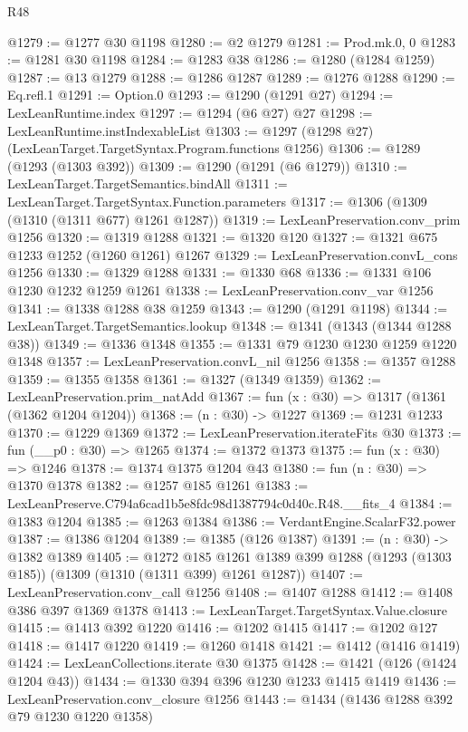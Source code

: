 \begin{lexlean}{R48}
\begin{coremodule}
@1279 := @1277 @30 @1198
@1280 := @2 @1279
@1281 := Prod.mk.{0, 0}
@1283 := @1281 @30 @1198
@1284 := @1283 @38
@1286 := @1280 (@1284 @1259)
@1287 := @13 @1279
@1288 := @1286 @1287
@1289 := @1276 @1288
@1290 := Eq.refl.{1}
@1291 := Option.{0}
@1293 := @1290 (@1291 @27)
@1294 := LexLeanRuntime.index
@1297 := @1294 (@6 @27) @27
@1298 := LexLeanRuntime.instIndexableList
@1303 := @1297 (@1298 @27) (LexLeanTarget.TargetSyntax.Program.functions @1256)
@1306 := @1289 (@1293 (@1303 @392))
@1309 := @1290 (@1291 (@6 @1279))
@1310 := LexLeanTarget.TargetSemantics.bindAll
@1311 := LexLeanTarget.TargetSyntax.Function.parameters
@1317 := @1306 (@1309 (@1310 (@1311 @677) @1261 @1287))
@1319 := LexLeanPreservation.conv_prim @1256
@1320 := @1319 @1288
@1321 := @1320 @120
@1327 := @1321 @675 @1233 @1252 (@1260 @1261) @1267
@1329 := LexLeanPreservation.convL_cons @1256
@1330 := @1329 @1288
@1331 := @1330 @68
@1336 := @1331 @106 @1230 @1232 @1259 @1261
@1338 := LexLeanPreservation.conv_var @1256
@1341 := @1338 @1288 @38 @1259
@1343 := @1290 (@1291 @1198)
@1344 := LexLeanTarget.TargetSemantics.lookup
@1348 := @1341 (@1343 (@1344 @1288 @38))
@1349 := @1336 @1348
@1355 := @1331 @79 @1230 @1230 @1259 @1220 @1348
@1357 := LexLeanPreservation.convL_nil @1256
@1358 := @1357 @1288
@1359 := @1355 @1358
@1361 := @1327 (@1349 @1359)
@1362 := LexLeanPreservation.prim_natAdd
@1367 := fun (x : @30) => @1317 (@1361 (@1362 @1204 @1204))
@1368 := (n : @30) -> @1227
@1369 := @1231 @1233
@1370 := @1229 @1369
@1372 := LexLeanPreservation.iterateFits @30
@1373 := fun (__p0 : @30) => @1265
@1374 := @1372 @1373
@1375 := fun (x : @30) => @1246
@1378 := @1374 @1375 @1204 @43
@1380 := fun (n : @30) => @1370 @1378
@1382 := @1257 @185 @1261
@1383 := LexLeanPreserve.C794a6cad1b5e8fdc98d1387794c0d40c.R48.__fits_4
@1384 := @1383 @1204
@1385 := @1263 @1384
@1386 := VerdantEngine.ScalarF32.power
@1387 := @1386 @1204
@1389 := @1385 (@126 @1387)
@1391 := (n : @30) -> @1382 @1389
@1405 := @1272
    @185
    @1261
    @1389
    @399
    @1288
    (@1293 (@1303 @185))
    (@1309 (@1310 (@1311 @399) @1261 @1287))
@1407 := LexLeanPreservation.conv_call @1256
@1408 := @1407 @1288
@1412 := @1408 @386 @397 @1369 @1378
@1413 := LexLeanTarget.TargetSyntax.Value.closure
@1415 := @1413 @392 @1220
@1416 := @1202 @1415
@1417 := @1202 @127
@1418 := @1417 @1220
@1419 := @1260 @1418
@1421 := @1412 (@1416 @1419)
@1424 := LexLeanCollections.iterate @30 @1375
@1428 := @1421 (@126 (@1424 @1204 @43))
@1434 := @1330 @394 @396 @1230 @1233 @1415 @1419
@1436 := LexLeanPreservation.conv_closure @1256
@1443 := @1434 (@1436 @1288 @392 @79 @1230 @1220 @1358)

\end{coremodule}
\end{lexlean}
